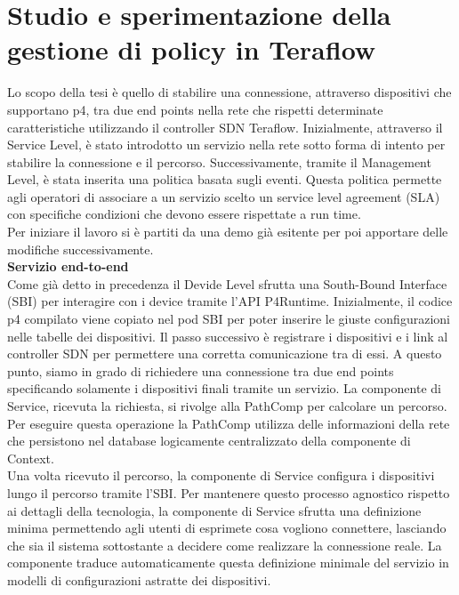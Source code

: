 \chapter{Studio e sperimentazione della gestione di policy in Teraflow}
\label{cap:policy}
Lo scopo della tesi è quello di stabilire una connessione, attraverso dispositivi che supportano p4, tra due end points nella rete che rispetti determinate caratteristiche utilizzando il controller SDN Teraflow.
Inizialmente, attraverso il Service Level, è stato introdotto un servizio nella rete sotto forma di intento per stabilire la connessione e il percorso. 
Successivamente, tramite il Management Level, è stata inserita una politica basata sugli eventi. Questa politica permette agli operatori 
di associare a un servizio scelto un service level agreement (SLA) con specifiche condizioni che devono essere rispettate a run time.
\\Per iniziare il lavoro si è partiti da una demo già esitente per poi apportare delle modifiche successivamente.
\\\textbf{Servizio end-to-end}
\\Come già detto in precedenza il Devide Level sfrutta una South-Bound Interface (SBI) per interagire con i device tramite l'API P4Runtime. 
Inizialmente, il codice p4 compilato viene copiato nel pod SBI per poter inserire le giuste configurazioni nelle tabelle dei dispositivi.
Il passo successivo è registrare i dispositivi e i link al controller SDN per permettere una corretta comunicazione tra di essi.
A questo punto, siamo in grado di richiedere una connessione tra due end points specificando solamente i dispositivi finali tramite un servizio.
La componente di Service, ricevuta la richiesta, si rivolge alla PathComp per calcolare un percorso.
Per eseguire questa operazione la PathComp utilizza delle informazioni della rete che persistono nel database logicamente centralizzato della componente di Context.
\\Una volta ricevuto il percorso, la componente di Service configura i dispositivi lungo il percorso tramite l'SBI.
Per mantenere questo processo agnostico rispetto ai dettagli della tecnologia, la componente di Service 
sfrutta una definizione minima permettendo agli utenti di esprimete cosa vogliono connettere, lasciando che sia il sistema sottostante a decidere come realizzare la connessione reale.
La componente traduce automaticamente questa definizione minimale del servizio in modelli di configurazioni astratte dei dispositivi. 
